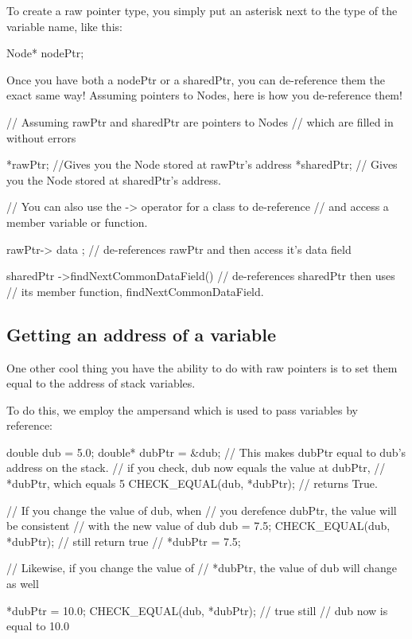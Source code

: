 \documentclass{tufte-handout}
\begin{document}
To create a raw pointer type, you simply put an asterisk next to the type of the variable name, like this:
\begin{Code}
    Node* nodePtr;
\end{Code}

Once you have both a nodePtr or a sharedPtr, you can de-reference them the exact same way!
Assuming pointers to Nodes, here is how you de-reference them!
\begin{Code}
    // Assuming rawPtr and sharedPtr are pointers to Nodes
    // which are filled in without errors
    
    *rawPtr; //Gives you the Node stored at rawPtr's address
    *sharedPtr; // Gives you the Node stored at sharedPtr's address.
    
    
    // You can also use the -> operator for a class to de-reference 
    // and access a member variable or function.
    
    rawPtr-> data ; 
    // de-references rawPtr and then access it's data field
    
    sharedPtr ->findNextCommonDataField() 
    // de-references sharedPtr then uses 
    // its member function, findNextCommonDataField.
     
\end{Code}

\subsection{Getting an address of a variable}
One other cool thing you have the ability to do with raw pointers is to set them equal to the address of stack variables.

To do this, we employ the ampersand which is used to pass variables by reference:
\begin{Code}
    double dub = 5.0; 
    double* dubPtr = &dub; 
    // This makes dubPtr equal to dub's address on the stack.
    // if you check, dub now equals the value at dubPtr,
    // *dubPtr, which equals 5 
    CHECK_EQUAL(dub, *dubPtr); // returns True.
    
    // If you change the value of dub, when
    // you derefence dubPtr, the value will be consistent
    // with the new value of dub
    dub = 7.5;
    CHECK_EQUAL(dub, *dubPtr); // still return true
    // *dubPtr = 7.5;
    
    // Likewise, if you change the value of 
    // *dubPtr, the value of dub will change as well
    
    *dubPtr = 10.0;
    CHECK_EQUAL(dub, *dubPtr); // true still
    // dub now is equal to 10.0
    
    
\end{Code}
\end{document}
